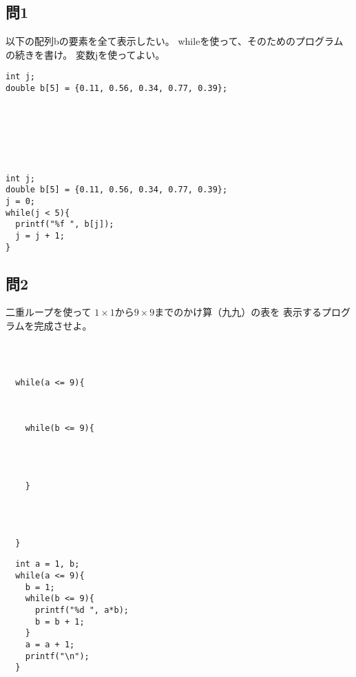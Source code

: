 \documentclass[a4j]{jarticle}
\begin{document}
\begin{multicols*}{2}
\subsection*{問1}

以下の配列{\ttfamily b}の要素を全て表示したい。
{\ttfamily while}を使って、そのためのプログラムの続きを書け。
変数{\ttfamily j}を使ってよい。


\ifnum {}
\begin{verbatim}
int j;
double b[5] = {0.11, 0.56, 0.34, 0.77, 0.39};







\end{verbatim}
\else
\begin{verbatim}
int j;
double b[5] = {0.11, 0.56, 0.34, 0.77, 0.39};
j = 0;
while(j < 5){
  printf("%f ", b[j]);
  j = j + 1;
}
\end{verbatim}
\fi
\vspace{5cm}



\subsection*{問2}



二重ループを使って
$1\times1$から$9\times9$までのかけ算（九九）の表を
表示するプログラムを完成させよ。


\ifnum {}
\begin{verbatim}



  while(a <= 9){



    while(b <= 9){




    }




  }
\end{verbatim}
\vspace{1cm}
\else
\begin{verbatim}
  int a = 1, b;
  while(a <= 9){
    b = 1;
    while(b <= 9){
      printf("%d ", a*b);
      b = b + 1;
    }
    a = a + 1;
    printf("\n");
  }
\end{verbatim}
\vspace{5cm}
\fi




%
%
%
%
%
%
%
%
%
%
%











\end{multicols*}
\end{document}
